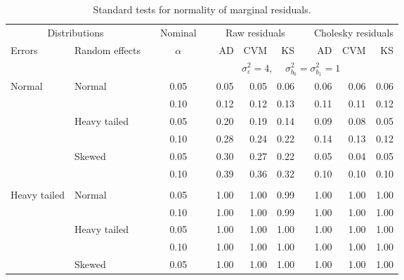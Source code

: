 \begin{table}[ht]
\begin{scriptsize}
\begin{center}
\begin{tabular}{ll p{.1cm} c p{.1cm} rrr p{.1cm} rrr p{.1cm} rrr}
   \hline
\end{tabular}
\end{center}
\end{scriptsize}
\end{table}

\begin{table}[ht]
\caption{\label{tab:evalmarginal}Standard tests for normality of marginal residuals.}
\begin{scriptsize}
\begin{center}
\begin{tabular}{ll p{.1cm} c p{.1cm} rrr p{.1cm} rrr}
  \hline
  \multicolumn{2}{c}{Distributions}& & Nominal & &  \multicolumn{3}{c}{Raw residuals} & & \multicolumn{3}{c}{Cholesky residuals} \\ \cline{1-2} \cline{6-8} \cline{10-12}
  Errors & Random effects & & $\alpha$ & & AD & CVM & KS & & AD & CVM & KS \\ 
   \hline
& && && \multicolumn{6}{c}{$\sigma_{\varepsilon}^2 = 4$, \ \ $\sigma_{b_0}^2 = \sigma_{b_1}^2 = 1$} \\ \cline{6-12}
\rowcolor{gray!20} Normal       & Normal       && 0.05 &&  0.05 & 0.05 & 0.06 && 0.06 & 0.06 & 0.06 \\ 
\rowcolor{gray!20}             &              && 0.10 &&  0.12 & 0.12 & 0.13 && 0.11 & 0.11 & 0.12 \\ 
\rowcolor{gray!20}             & Heavy tailed && 0.05 &&  0.20 & 0.19 & 0.14 && 0.09 & 0.08 & 0.05 \\ 
\rowcolor{gray!20}             &              && 0.10 &&  0.28 & 0.24 & 0.22 && 0.14 & 0.13 & 0.12 \\ 
\rowcolor{gray!20}             & Skewed       && 0.05 &&  0.30 & 0.27 & 0.22 && 0.05 & 0.04 & 0.05 \\ 
\rowcolor{gray!20}             &              && 0.10 &&  0.39 & 0.36 & 0.32 && 0.10 & 0.10 & 0.10 \\ 
             &&&&&&&&&&&\\
Heavy tailed & Normal       && 0.05 &&  1.00 & 1.00 & 0.99 && 1.00 & 1.00 & 1.00 \\ 
             &              && 0.10 &&  1.00 & 1.00 & 0.99 && 1.00 & 1.00 & 1.00 \\ 
             & Heavy tailed && 0.05 &&  1.00 & 1.00 & 1.00 && 1.00 & 1.00 & 1.00 \\ 
             &              && 0.10 &&  1.00 & 1.00 & 1.00 && 1.00 & 1.00 & 1.00 \\ 
             & Skewed       && 0.05 &&  1.00 & 1.00 & 1.00 && 1.00 & 1.00 & 1.00 \\ 

\end{tabular}
\end{center}
\end{scriptsize}
\end{table}
